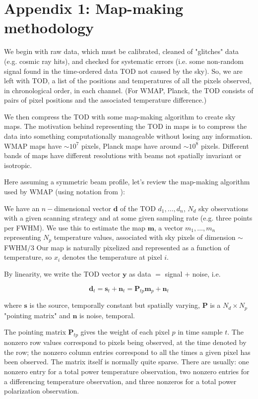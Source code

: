 \documentclass[12pt]{article}
\begin{document}
\section*{Appendix 1: Map-making methodology}

We begin with raw data, which must be calibrated, cleaned of "glitches" data (e.g. cosmic ray hits), and checked for systematic errors (i.e. some non-random signal found in the time-ordered data TOD not caused by the sky). So, we are left with TOD, a list of the positions and temperatures of all the pixels observed, in chronological order, in each channel. (For WMAP, Planck, the TOD consists of pairs of pixel positions and the associated temperature difference.)

We then compress the TOD with some map-making algorithm to create sky maps. The motivation behind representing the TOD in maps is to compress the data into something computationally manageable without losing any information. WMAP maps have $\sim10^7$ pixels, Planck maps have around $\sim10^8$ pixels. Different bands of maps have different resolutions with beams not spatially invariant or isotropic.

Here assuming a symmetric beam profile, let's review the map-making algorithm used by WMAP (using notation from \cite{Natoli}):

We have an $n-$dimensional vector $\textbf{d}$ of the TOD $d_1,\dots,d_n$,  $N_d$ sky observations with a given scanning strategy and at some given sampling rate (e.g. three points per FWHM). We use this to estimate the map $\textbf{m}$, a vector $m_1,\dots,m_n$ representing $N_p$ temperature values, associated with sky pixels of dimension $\sim$FWHM$/3$ Our map is naturally pixelized and represented as a function of temperature, so $x_i$ denotes the temperature at pixel $i$. 

By linearity, we write the TOD vector $\textbf{y}$ as data $=$ signal $+$ noise, i.e.

\begin{equation}
\textbf{d}_t=\textbf{s}_t+\textbf{n}_t=\textbf{P}_{tp}\textbf{m}_p+\textbf{n}_t
\end{equation}

where $\textbf{s}$ is the source, temporally constant but spatially varying, $\textbf{P}$ is a $N_d\times N_p$ "pointing matrix" and $\textbf{n}$ is noise, temporal.

The pointing matrix $\textbf{P}_{tp}$ gives the weight of each pixel $p$ in time sample $t$. The nonzero row values correspond to pixels being observed, at the time denoted by the row; the nonzero column entries correspond to all the times a given pixel has been observed. The matrix itself is normally quite sparse. There are usually: one nonzero entry for a total power temperature observation, two nonzero entries for a differencing temperature observation, and three nonzeros for a total power polarization observation. 
\end{document}
